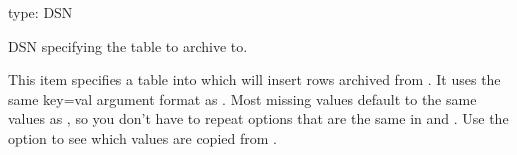 \documentclass[letterpaper,10pt,english]{sphinxmanual}
\begin{document}

\begin{fulllineitems}
\label{\detokenize{mariadb-archiver:cmdoption-mariadb-archiver-dest}}
type: DSN

DSN specifying the table to archive to.

This item specifies a table into which  will insert rows
archived from {\hyperref[\detokenize{mariadb-archiver:cmdoption-mariadb-archiver-source}]{}}.  It uses the same key=val argument format as
{\hyperref[\detokenize{mariadb-archiver:cmdoption-mariadb-archiver-source}]{}}.  Most missing values default to the same values as
{\hyperref[\detokenize{mariadb-archiver:cmdoption-mariadb-archiver-source}]{}}, so you don’t have to repeat options that are the same in
{\hyperref[\detokenize{mariadb-archiver:cmdoption-mariadb-archiver-source}]{}} and {\hyperref[\detokenize{mariadb-archiver:cmdoption-mariadb-archiver-dest}]{}}.  Use the {\hyperref[\detokenize{mariadb-archiver:cmdoption-mariadb-archiver-help}]{}} option to see which values
are copied from {\hyperref[\detokenize{mariadb-archiver:cmdoption-mariadb-archiver-source}]{}}.


\end{fulllineitems}
\end{document}
